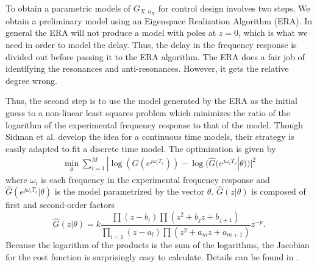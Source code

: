 \documentclass[journal,twocolumn,twoside]{IEEEtran}
\begin{document}


To obtain a parametric models of $G_{X,u_X}$ for control design involves two steps. We obtain a preliminary model using an Eigenspace Realization Algorithm (ERA). In general the ERA will not produce a model with poles at $z=0$, which is what we need in order to model the delay. Thus, the delay in the frequency response is divided out before passing it to the ERA algorithm. The ERA does a fair job of identifying the resonances and anti-resonances. However, it gets the relative degree wrong.

Thus, the second step is to use the model generated by the ERA as the initial guess to a non-linear least squares problem \cite{sidman_parametric_1991} which minimizes the ratio of the logarithm of the experimental frequency response to that of the model. Though Sidman et al. develop the idea for a continuous time models, their strategy is easily adapted to fit a discrete time model. The optimization is given by
\begin{align}
\min_{\theta} \sum_{i=1}^M| \log(G(e^{j\omega_iT_s})) - \log(\hat{G}(e^{j\omega_iT_s}|\theta))|^2
\label{eqn:logfit}
\end{align}
where $\omega_i$ is each frequency in the experimental frequency response and $\hat{G}(e^{j\omega_iT_s}|\theta)$ is the model parametrized by the vector $\theta$. $\hat{G}(z|\theta)$ is composed of first and second-order factors
\begin{equation}
  \hat{G}(z|\theta) =k \frac{\prod (z-b_i) \prod(z^2 +b_jz + b_{j+1})}
  { \prod_{l=1}(z-a_l) \prod(z^2 +a_mz + a_{m+1})}z^{-p}. \label{eqn:mode_struc}
\end{equation}
Because the logarithm of the products is the sum of the logarithms, the Jacobian for the cost function is surprisingly easy to calculate. Details can be found in \cite{sidman_parametric_1991}.
\end{document}
